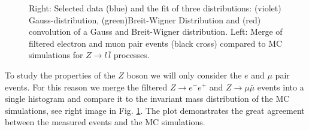 \documentclass[11 pt]{article}
\begin{document}
\begin{figure}[htbp] 
    \centering
    \begin{subfigure}{0.45\textwidth}
        \centering
    \end{subfigure}
    \hfill
    \begin{subfigure}{0.45\textwidth}
        \centering
    \end{subfigure}
\vspace{1em}
    \caption{\small Right: Selected data (blue) and the fit of three distributions: (violet) Gauss-distribution, (green)Breit-Wigner Distribution and (red) convolution of a Gauss and Breit-Wigner distribution. Left: Merge of filtered electron and muon pair events  (black cross) compared to MC simulations for $Z\to l\,\bar{l}$ processes.}
    \label{fig:results_selected_data}
\end{figure}
To study the properties of the $Z$ boson we will only consider the $e$ and $\mu$ pair events. For this reason we merge the filtered $Z\to e^-e^+$ and $Z\to \mu\bar{\mu}$ events into a single histogram and compare it to the invariant mass distribution of the MC simulations, see right image in Fig. \ref{fig:results_selected_data}. The plot demonstrates the great agreement between the measured events and the MC simulations. 
\end{document}
